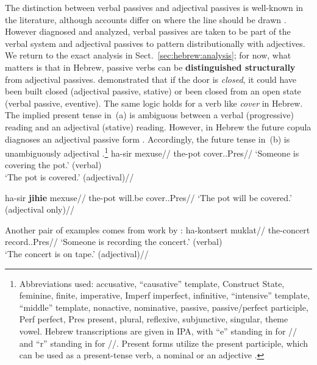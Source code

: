 The distinction between verbal passives and adjectival passives is well-known in the literature, although accounts differ on where the line should be drawn \citep{wasow77,levinrappaport86,borerwexler87,embick04li,bruening14nllt}. However diagnosed and analyzed, verbal passives are taken to be part of the verbal system and adjectival passives to pattern distributionally with adjectives. We return to the exact analysis in Sect.~\ref{sec:hebrew:analysis}; for now, what matters is that in Hebrew, passive verbs can be \textbf{distinguished structurally} from adjectival passives. \cite{embick04li} demonstrated that if the door is \emph{closed}, it could have been built closed (adjectival passive, stative) or been closed from an open state (verbal passive, eventive). The same logic holds for a verb like \emph{cover} in Hebrew. The implied present tense in~(\nextx a) is ambiguous between a verbal (progressive) reading and an adjectival (stative) reading. However, in Hebrew the future copula diagnoses an adjectival passive form \citep{doron00}. Accordingly, the future tense in~(\nextx b) is unambiguously adjectival \citep{doron00,horvathsiloni08,meltzerasscher11}.\footnote{Abbreviations used:  accusative,  ``causative'' template,  Construct State,  feminine,  finite,  imperative, Imperf imperfect,  infinitive,  ``intensive'' template,  ``middle'' template,  nonactive,  nominative,  passive,  passive/perfect participle, Perf perfect, Pres present,  plural,  reflexive,  subjunctive,  singular,  theme vowel. Hebrew transcriptions are given in IPA, with ``e'' standing in for // and ``r'' standing in for //. Present forms utilize the present participle, which can be used as a present-tense verb, a nominal or an adjective \citep{boneh13tense,doron13ehll}.}
\pex \label{ex:pres-ambig}
    \a \begingl
        \gla{}ha-sir mexuse//
        \glb the-pot cover..Pres//
        \glft `Someone is covering the pot.' (verbal)\\`The pot is covered.' (adjectival)//
    \endgl
        
    \a \begingl
        \gla{}ha-sir \textbf{jihie} mexuse//
        \glb the-pot will.be cover..Pres//
        \glft `The pot will be covered.' (adjectival only)//
    \endgl
\xe

Another pair of examples comes from work by \cite{doron00}:
\pex \label{ex:pres-ambig2}
    \a \begingl
        \gla{}ha-kontsert muklat//
        \glb the-concert record..Pres//
        \glft `Someone is recording the concert.' (verbal)\\`The concert is on tape.' (adjectival)//
    \endgl
        
